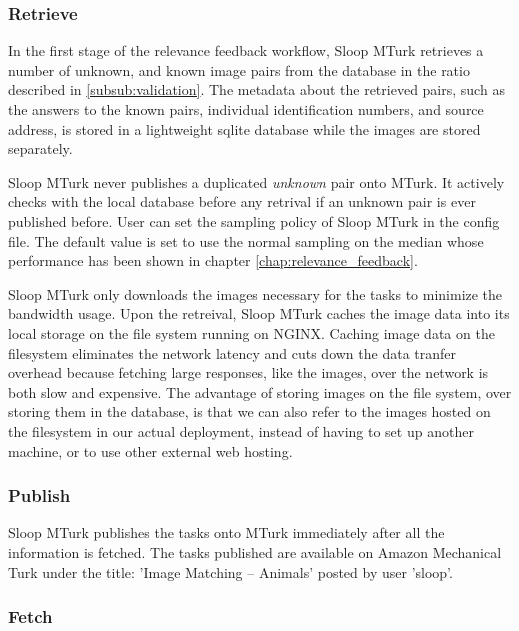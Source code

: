 \subsubsection{Retrieve}

In the first stage of the relevance feedback workflow, Sloop MTurk retrieves a
number of unknown, and known image pairs from the database in the ratio
described in \ref{subsub:validation}. The metadata about the retrieved pairs,
such as the answers to the known pairs, individual identification numbers, and
source address, is stored in a lightweight sqlite database while the images are
stored separately.

Sloop MTurk never publishes a duplicated \emph{unknown} pair onto MTurk. It
actively checks with the local database before any retrival if an unknown pair
is ever published before. User can set the sampling policy of Sloop MTurk in
the config file. The default value is set to use the normal sampling on the
median whose performance has been shown in chapter
\ref{chap:relevance_feedback}.

Sloop MTurk only downloads the images necessary for the tasks to minimize the
bandwidth usage. Upon the retreival, Sloop MTurk caches the image data into its
local storage on the file system running on NGINX. Caching image data on the
filesystem eliminates the network latency and cuts down the data tranfer
overhead because fetching large responses, like the images, over the network is
both slow and expensive. The advantage of storing images on the file system,
over storing them in the database, is that we can also refer to the images
hosted on the filesystem in our actual deployment, instead of having to set up
another machine, or to use other external web hosting.

\subsubsection{Publish}

Sloop MTurk publishes the tasks onto MTurk immediately after all the
information is fetched. The tasks published are available on Amazon Mechanical
Turk under the title: 'Image Matching -- Animals' posted by user 'sloop'. 

\subsubsection{Fetch}

